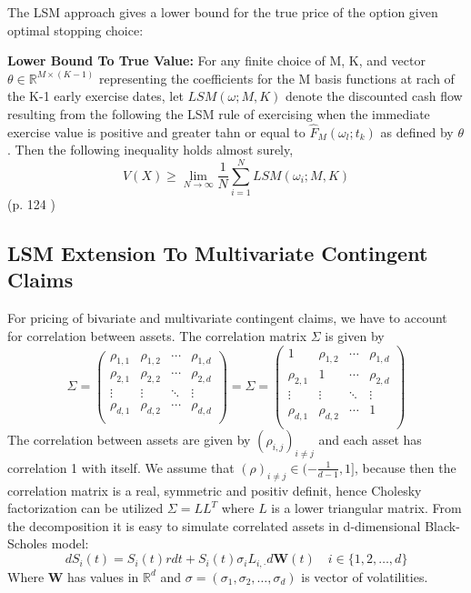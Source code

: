 The LSM approach gives a lower bound for the true price of the option given optimal stopping choice:
\theoremstyle{proposition}
\begin{proposition}{}\label{Lower-Bound-LSM}
\textbf{Lower Bound To True Value:} For any finite choice of M, K, and vector $\theta\in \mathbb{R}^{M \times (K-1)}$ representing the coefficients for the M basis functions at rach of the K-1 early exercise dates, let $LSM(\omega;M,K)$ denote the discounted cash flow resulting from the following the LSM rule of exercising when the immediate exercise value is positive and greater tahn or equal to $\hat{F}_{M}(\omega_{l};t_{k})$ as defined by $\theta$. Then the following inequality holds almost surely,
$$V(X)\geq \lim_{N\to \infty} \dfrac{1}{N}\sum_{i=1}^{N} LSM(\omega_i;M,K)$$
(p. 124 \parencite{lsm})
\end{proposition}


\subsection{LSM Extension To Multivariate Contingent Claims}
For pricing of bivariate and multivariate contingent claims, we have to account for correlation between assets. The correlation matrix $\Sigma$ is given by
\begin{equation}
\Sigma = \begin{pmatrix}
\rho_{1,1} & \rho_{1,2} & \cdots & \rho_{1,d} \\
\rho_{2,1} & \rho_{2,2} & \cdots & \rho_{2,d} \\
\vdots & \vdots & \ddots & \vdots \\
\rho_{d,1} & \rho_{d,2} & \cdots & \rho_{d,d} \\
\end{pmatrix} = \Sigma = \begin{pmatrix}
1 & \rho_{1,2} & \cdots & \rho_{1,d} \\
\rho_{2,1} & 1 & \cdots & \rho_{2,d} \\
\vdots & \vdots & \ddots & \vdots \\
\rho_{d,1} & \rho_{d,2} & \cdots & 1 \\
\end{pmatrix}
\end{equation}
The correlation between assets are given by $(\rho_{i,j})_{i\neq j}$ and each asset has correlation 1 with itself. We assume that $(\rho)_{i \neq j} \in (-\frac{1}{d-1},1]$, because then the correlation matrix is a real, symmetric and positiv definit, hence Cholesky factorization can be utilized $\Sigma=LL^T$ where $L$ is a lower triangular matrix. From the decomposition it is easy to simulate correlated assets in d-dimensional Black-Scholes model:
\begin{equation}
dS_{i}(t)=S_{i}(t) r dt + S_{i}(t) \sigma_i L_{i,\cdot} d\bm{W}(t) \quad i \in \{1,2,\ldots, d\}
\end{equation}
Where $\bm{W}$ has values in $\mathbb{R}^d$ and $\sigma=(\sigma_1, \sigma_2, \ldots, \sigma_d)$ is vector of volatilities.\\

